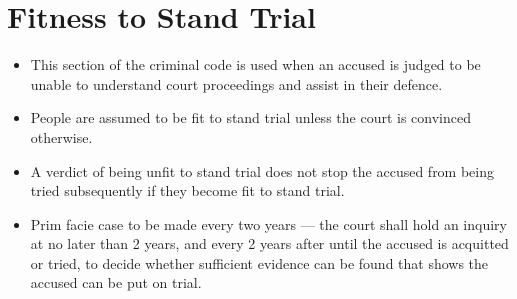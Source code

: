 \documentclass{article}
\begin{document}
\section{Fitness to Stand Trial}
\begin{itemize}
    \item This section of the criminal code is used when an accused is judged to be unable to understand court proceedings and assist in their defence.
    \item People are assumed to be fit to stand trial unless the court is convinced otherwise.
    \item A verdict of being unfit to stand trial does not stop the accused from being tried subsequently if they become fit to stand trial.
    \item Prim facie case to be made every two years --- the court shall hold an inquiry at no later than 2 years, and every 2 years after until the accused is acquitted or tried, to decide whether sufficient evidence can be found that shows the accused can be put on trial.
\end{itemize}
\end{document}
